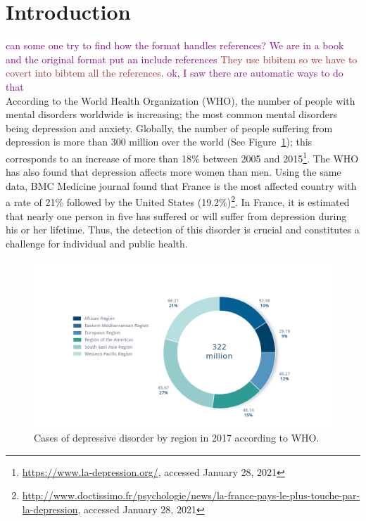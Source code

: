 \documentclass[graybox]{svmult}
\newcommand{\fr}[1]{\textcolor{brown}{#1}}
\newcommand{\jm}[1]{\textcolor{purple}{{  #1}}}
\begin{document}
\section{Introduction}


\jm{can some one try to find how the format handles references? We are in a book and the original format put an include references \fr{They use bibitem so we have to covert into bibtem all the references.} \jm{ok, I saw there are automatic ways to do that}}\\

According to the World Health Organization (WHO), the number of people with mental disorders worldwide is increasing; the most common mental disorders being depression and anxiety. Globally, the number of people suffering from depression is more than 300 million over the world (See Figure~\ref{fig:stat_depression}); this corresponds to an increase of more than 18\% between 2005 and 2015\footnote{\url{https://www.la-depression.org/}, accessed January 28, 2021}. The WHO has also found that depression affects more women than men.  Using the same data,  BMC Medicine journal found that France is the most affected country with a rate of 21\% followed by the United States (19.2\%)\footnote{\url{http://www.doctissimo.fr/psychologie/news/la-france-pays-le-plus-touche-par-la-depression}, accessed January 28, 2021}. In France, it is estimated that nearly one person in five has suffered or will suffer from depression during his or her lifetime. Thus, the detection of this disorder is crucial and constitutes a challenge for individual and public health.

\begin{figure}[!ht]
	\centering
	\includegraphics [scale=0.2]{images/stat_depression.png}
	\caption{Cases of depressive disorder by region in 2017 according to WHO. \cite{world2017depression}}
	\label{fig:stat_depression}
\end{figure}
\end{document}
